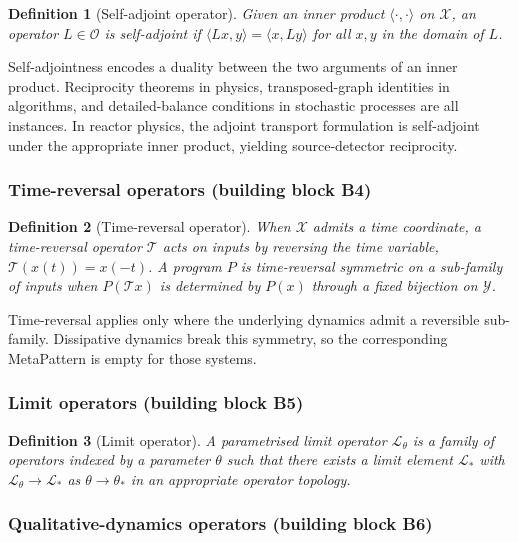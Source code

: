 \documentclass[acmsmall, screen]{acmart}
\newtheorem{definition}{Definition}
\begin{document}
\begin{definition}[Self-adjoint operator]
Given an inner product $\langle\cdot,\cdot\rangle$ on $\mathcal{X}$, an operator $L \in \mathcal{O}$ is \emph{self-adjoint} if $\langle Lx, y\rangle = \langle x, Ly\rangle$ for all $x, y$ in the domain of $L$.
\end{definition}

Self-adjointness encodes a duality between the two arguments of an inner product. Reciprocity theorems in physics, transposed-graph identities in algorithms, and detailed-balance conditions in stochastic processes are all instances. In reactor physics, the adjoint transport formulation is self-adjoint under the appropriate inner product, yielding source-detector reciprocity.

\subsubsection{Time-reversal operators (building block B4)}

\begin{definition}[Time-reversal operator]
When $\mathcal{X}$ admits a time coordinate, a \emph{time-reversal operator} $\mathcal{T}$ acts on inputs by reversing the time variable, $\mathcal{T}(x(t)) = x(-t)$. A program $P$ is \emph{time-reversal symmetric} on a sub-family of inputs when $P(\mathcal{T} x)$ is determined by $P(x)$ through a fixed bijection on $\mathcal{Y}$.
\end{definition}

Time-reversal applies only where the underlying dynamics admit a reversible sub-family. Dissipative dynamics break this symmetry, so the corresponding MetaPattern is empty for those systems.

\subsubsection{Limit operators (building block B5)}

\begin{definition}[Limit operator]
A \emph{parametrised limit operator} $\mathcal{L}_\theta$ is a family of operators indexed by a parameter $\theta$ such that there exists a limit element $\mathcal{L}_*$ with $\mathcal{L}_\theta \to \mathcal{L}_*$ as $\theta \to \theta_*$ in an appropriate operator topology.
\end{definition}

\subsubsection{Qualitative-dynamics operators (building block B6)}
\end{document}
